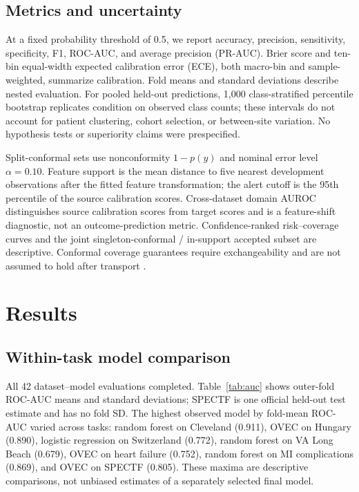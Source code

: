 \documentclass[conference]{IEEEtran}
\begin{document}
\subsection{Metrics and uncertainty}
At a fixed probability threshold of 0.5, we report accuracy, precision, sensitivity, specificity, F1, ROC-AUC, and average precision (PR-AUC). Brier score and ten-bin equal-width expected calibration error (ECE), both macro-bin and sample-weighted, summarize calibration. Fold means and standard deviations describe nested evaluation. For pooled held-out predictions, 1,000 class-stratified percentile bootstrap replicates condition on observed class counts; these intervals do not account for patient clustering, cohort selection, or between-site variation. No hypothesis tests or superiority claims were prespecified.

Split-conformal sets use nonconformity $1-p(y)$ and nominal error level $\alpha=0.10$. Feature support is the mean distance to five nearest development observations after the fitted feature transformation; the alert cutoff is the 95th percentile of the source calibration scores. Cross-dataset domain AUROC distinguishes source calibration scores from target scores and is a feature-shift diagnostic, not an outcome-prediction metric. Confidence-ranked risk--coverage curves and the joint singleton-conformal / in-support accepted subset are descriptive. Conformal coverage guarantees require exchangeability and are not assumed to hold after transport \cite{angelopoulos2023conformal}.

\section{Results}
\subsection{Within-task model comparison}
All 42 dataset--model evaluations completed. Table~\ref{tab:auc} shows outer-fold ROC-AUC means and standard deviations; SPECTF is one official held-out test estimate and has no fold SD. The highest observed model by fold-mean ROC-AUC varied across tasks: random forest on Cleveland (0.911), OVEC on Hungary (0.890), logistic regression on Switzerland (0.772), random forest on VA Long Beach (0.679), OVEC on heart failure (0.752), random forest on MI complications (0.869), and OVEC on SPECTF (0.805). These maxima are descriptive comparisons, not unbiased estimates of a separately selected final model.
\end{document}
